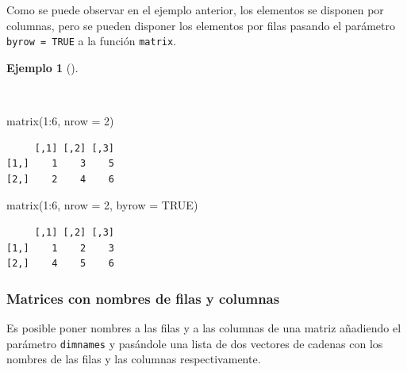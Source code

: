\documentclass[
  a4paper,
]{scrreport}
\newenvironment{Shaded}{\begin{snugshade}}{\end{snugshade}}
\newcommand{\AttributeTok}[1]{\textcolor[rgb]{0.40,0.45,0.13}{#1}}
\newcommand{\ConstantTok}[1]{\textcolor[rgb]{0.56,0.35,0.01}{#1}}
\newcommand{\DecValTok}[1]{\textcolor[rgb]{0.68,0.00,0.00}{#1}}
\newcommand{\FunctionTok}[1]{\textcolor[rgb]{0.28,0.35,0.67}{#1}}
\newcommand{\NormalTok}[1]{\textcolor[rgb]{0.00,0.23,0.31}{#1}}
\newcommand{\SpecialCharTok}[1]{\textcolor[rgb]{0.37,0.37,0.37}{#1}}
\theoremstyle{definition}
\theoremstyle{definition}
\newtheorem{example}{Ejemplo}[chapter]
\theoremstyle{remark}
\begin{document}
Como se puede observar en el ejemplo anterior, los elementos se disponen
por columnas, pero se pueden disponer los elementos por filas pasando el
parámetro \texttt{byrow\ =\ TRUE} a la función \texttt{matrix}.

\begin{example}[]\protect\hypertarget{exm-creacion-matrices-por-filas}{}\label{exm-creacion-matrices-por-filas}

~

\begin{Shaded}
\begin{Highlighting}[]
\FunctionTok{matrix}\NormalTok{(}\DecValTok{1}\SpecialCharTok{:}\DecValTok{6}\NormalTok{, }\AttributeTok{nrow =} \DecValTok{2}\NormalTok{)}
\end{Highlighting}
\end{Shaded}

\begin{verbatim}
     [,1] [,2] [,3]
[1,]    1    3    5
[2,]    2    4    6
\end{verbatim}

\begin{Shaded}
\begin{Highlighting}[]
\FunctionTok{matrix}\NormalTok{(}\DecValTok{1}\SpecialCharTok{:}\DecValTok{6}\NormalTok{, }\AttributeTok{nrow =} \DecValTok{2}\NormalTok{, }\AttributeTok{byrow =} \ConstantTok{TRUE}\NormalTok{)}
\end{Highlighting}
\end{Shaded}

\begin{verbatim}
     [,1] [,2] [,3]
[1,]    1    2    3
[2,]    4    5    6
\end{verbatim}

\end{example}

\subsubsection{Matrices con nombres de filas y
columnas}\label{matrices-con-nombres-de-filas-y-columnas}

Es posible poner nombres a las filas y a las columnas de una matriz
añadiendo el parámetro \texttt{dimnames} y pasándole una lista de dos
vectores de cadenas con los nombres de las filas y las columnas
respectivamente.
\end{document}
